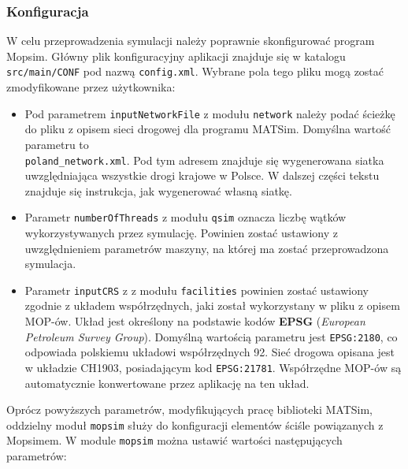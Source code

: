 \subsubsection{Konfiguracja}
W celu przeprowadzenia symulacji należy poprawnie skonfigurować program Mopsim. Główny plik konfiguracyjny aplikacji znajduje się w katalogu \texttt{src/main/CONF} pod nazwą \texttt{config.xml}. Wybrane pola tego pliku mogą zostać zmodyfikowane przez użytkownika:
\begin{itemize}
\item Pod parametrem \texttt{inputNetworkFile} z modułu \texttt{network} należy podać ścieżkę do pliku z opisem sieci drogowej dla programu MATSim. Domyślna wartość parametru to \\\texttt{poland\_network.xml}. Pod tym adresem znajduje się wygenerowana siatka uwzględniająca wszystkie drogi krajowe w Polsce. W dalszej części tekstu znajduje się instrukcja, jak wygenerować własną siatkę.
\item Parametr \texttt{numberOfThreads} z modułu \texttt{qsim} oznacza liczbę wątków wykorzystywanych przez symulację. Powinien zostać ustawiony z uwzględnieniem parametrów maszyny, na której ma zostać przeprowadzona symulacja.
\item Parametr \texttt{inputCRS} z z modułu \texttt{facilities} powinien zostać ustawiony zgodnie z układem współrzędnych, jaki został wykorzystany w pliku z opisem MOP-ów. Układ jest określony na podstawie kodów \textbf{EPSG} (\textit{European Petroleum Survey Group}). Domyślną wartością parametru jest \texttt{EPSG:2180}, co odpowiada polskiemu układowi współrzędnych 92. Sieć drogowa opisana jest w układzie CH1903, posiadającym kod \texttt{EPSG:21781}. Współrzędne MOP-ów są automatycznie konwertowane przez aplikację na ten układ.
\end{itemize}
Oprócz powyższych parametrów, modyfikujących pracę biblioteki MATSim, oddzielny moduł \texttt{mopsim} służy do konfiguracji elementów ściśle powiązanych z Mopsimem. W module \texttt{mopsim} można ustawić wartości następujących parametrów:
